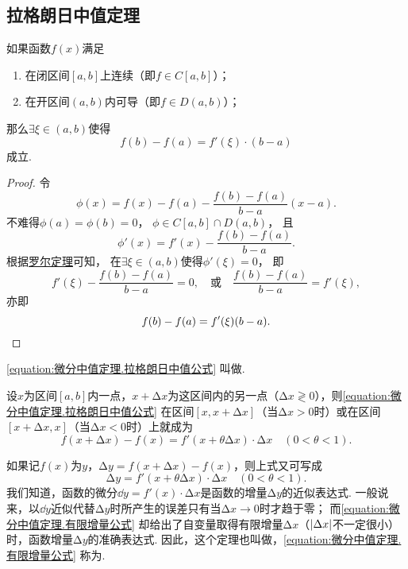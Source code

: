 \subsection{拉格朗日中值定理}
\begin{theorem}[拉格朗日中值定理]\label{theorem:微分中值定理.拉格朗日中值定理}
如果函数\(f(x)\)满足
\begin{enumerate}
\item 在闭区间\([a,b]\)上连续（即\(f \in C[a,b]\)）；
\item 在开区间\((a,b)\)内可导（即\(f \in D(a,b)\)）；
\end{enumerate}
那么\(\exists \xi \in (a,b)\)使得
\begin{equation}\label{equation:微分中值定理.拉格朗日中值公式}
f(b)-f(a)=f'(\xi) \cdot (b-a)
\end{equation}
成立.
\begin{proof}
令\[
	\phi(x)=f(x)-f(a)-\frac{f(b)-f(a)}{b-a}(x-a).
\]
不难得\(\phi(a)=\phi(b)=0\)，
\(\phi\in C[a,b]\cap D(a,b)\)，
且\[
	\phi'(x)=f'(x)-\frac{f(b)-f(a)}{b-a}.
\]
根据\hyperref[theorem:微分中值定理.罗尔定理]{罗尔定理}可知，
在\(\exists\xi\in(a,b)\)使得\(\phi'(\xi)=0\)，
即\[
	f'(\xi)-\frac{f(b)-f(a)}{b-a}=0,
	\quad\text{或}\quad
	\frac{f(b)-f(a)}{b-a}=f'(\xi),
\]
亦即\[
	f(b)-f(a)=f'(\xi)(b-a).
	\qedhere
\]
\end{proof}
\end{theorem}
\cref{equation:微分中值定理.拉格朗日中值公式} 叫做.

设\(x\)为区间\([a,b]\)内一点，\(x+\increment x\)为这区间内的另一点（\(\increment x \gtrless 0\)），则\cref{equation:微分中值定理.拉格朗日中值公式} 在区间\([x,x+\increment x]\)（当\(\increment x>0\)时）或在区间\([x+\increment x,x]\)（当\(\increment x<0\)时）上就成为
\begin{equation}
f(x+\increment x) - f(x)
= f'(x+\theta \increment x) \cdot \increment x
\quad(0<\theta<1).
\end{equation}

如果记\(f(x)\)为\(y\)，\(\increment y = f(x+\increment x) - f(x)\)，则上式又可写成
\begin{equation}\label{equation:微分中值定理.有限增量公式}
\increment y = f'(x+\theta \increment x) \cdot \increment x
\quad(0<\theta<1).
\end{equation}
我们知道，函数的微分\(\dd{y} = f'(x) \cdot \increment x\)是函数的增量\(\increment y\)的近似表达式.
一般说来，以\(\dd{y}\)近似代替\(\increment y\)时所产生的误差只有当\(\increment x\to0\)时才趋于零；
而\cref{equation:微分中值定理.有限增量公式} 却给出了自变量取得有限增量\(\increment x\)（\(\abs{\Delta x}\)不一定很小）时，函数增量\(\increment y\)的准确表达式.
因此，这个定理也叫做，\cref{equation:微分中值定理.有限增量公式} 称为.

